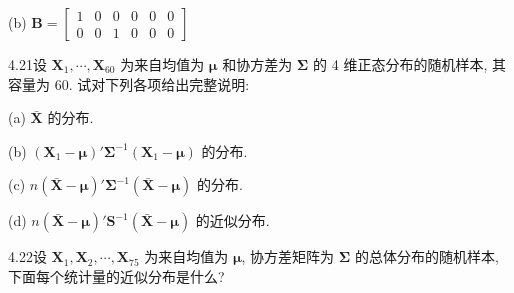 (b) $\mathbf{B}=\begin{bmatrix}1&0&0&0&0&0\\0&0&1&0&0&0\end{bmatrix}$

4.21\quad 设 $\mathbf{X}_{1},\cdots,\mathbf{X}_{60}$ 为来自均值为 $\boldsymbol{\mu}$ 和协方差为 $\boldsymbol{\Sigma}$ 的 4 维正态分布的随机样本, 其容量为 60. 试对下列各项给出完整说明:

(a) $\bar{\mathbf{X}}$ 的分布.

(b) $(\mathbf{X}_{1}-\boldsymbol{\mu})'\boldsymbol{\Sigma}^{-1}(\mathbf{X}_{1}-\boldsymbol{\mu})$ 的分布.

(c) $n(\bar{\mathbf{X}}-\boldsymbol{\mu})'\boldsymbol{\Sigma}^{-1}(\bar{\mathbf{X}}-\boldsymbol{\mu})$ 的分布.

(d) $n(\bar{\mathbf{X}}-\boldsymbol{\mu})'\mathbf{S}^{-1}(\bar{\mathbf{X}}-\boldsymbol{\mu})$ 的近似分布.

4.22\quad 设 $\mathbf{X}_{1},\mathbf{X}_{2},\cdots,\mathbf{X}_{75}$ 为来自均值为 $\boldsymbol{\mu}$, 协方差矩阵为 $\boldsymbol{\Sigma}$ 的总体分布的随机样本, 下面每个统计量的近似分布是什么?
